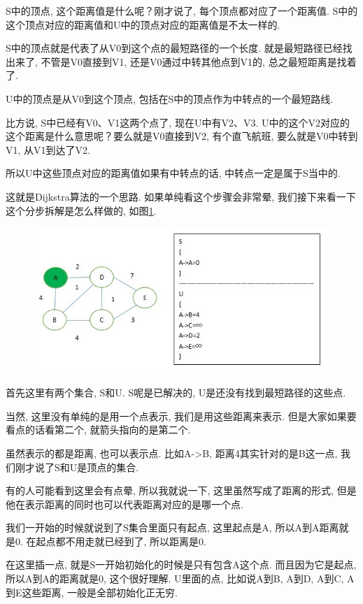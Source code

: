 S中的顶点, 这个距离值是什么呢？刚才说了, 每个顶点都对应了一个距离值. S中的这个顶点对应的距离值和U中的顶点对应的距离值是不太一样的. 

S中的顶点就是代表了从V0到这个点的最短路径的一个长度. 就是最短路径已经找出来了, 不管是V0直接到V1, 还是V0通过中转其他点到V1的, 总之最短距离是找着了. 

U中的顶点是从V0到这个顶点, 包括在S中的顶点作为中转点的一个最短路线. 

比方说, S中已经有V0、V1这两个点了, 现在U中有V2、V3. U中的这个V2对应的这个距离是什么意思呢？要么就是V0直接到V2, 有个直飞航班, 要么就是V0中转到V1, 从V1到达了V2. 

所以U中这些顶点对应的距离值如果有中转点的话, 中转点一定是属于S当中的. 

这就是Dijkstra算法的一个思路. 如果单纯看这个步骤会非常晕, 我们接下来看一下这个分步拆解是怎么样做的, 如图\ref{fig:img26_3}. 

\begin{figure}[ht]
  \centering
  \includegraphics[width=0.7\linewidth]{asset/20230924051222.jpg}
  \caption{}
  \label{fig:img26_3}
\end{figure}

首先这里有两个集合, S和U.  S呢是已解决的, U是还没有找到最短路径的这些点. 

当然, 这里没有单纯的是用一个点表示, 我们是用这些距离来表示. 但是大家如果要看点的话看第二个, 就箭头指向的是第二个. 

虽然表示的都是距离, 也可以表示点. 比如A->B, 距离4其实针对的是B这一点, 我们刚才说了S和U是顶点的集合. 

有的人可能看到这里会有点晕, 所以我就说一下, 这里虽然写成了距离的形式, 但是他在表示距离的同时也可以代表距离对应的是哪一个点. 

我们一开始的时候就说到了S集合里面只有起点, 这里起点是A, 所以A到A距离就是0. 在起点都不用走就已经到了, 所以距离是0. 

在这里插一点, 就是S一开始初始化的时候是只有包含A这个点. 而且因为它是起点, 所以A到A的距离就是0, 这个很好理解. U里面的点, 比如说A到B, A到D, A到C, A到E这些距离, 一般是全部初始化正无穷. 

